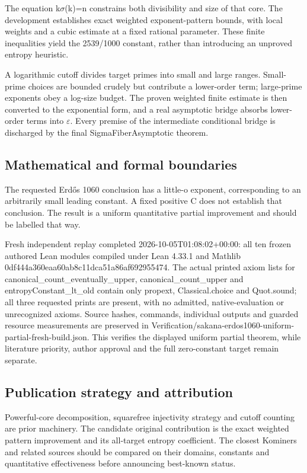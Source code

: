 \documentclass[11pt,a4paper]{article}
\begin{document}
The equation k\ensuremath{\sigma}(k)=n constrains both divisibility and size of that core. The development establishes exact weighted exponent-pattern bounds, with local weights and a cubic estimate at a fixed rational parameter. These finite inequalities yield the 2539/1000 constant, rather than introducing an unproved entropy heuristic.

A logarithmic cutoff divides target primes into small and large ranges. Small-prime choices are bounded crudely but contribute a lower-order term; large-prime exponents obey a log-size budget. The proven weighted finite estimate is then converted to the exponential form, and a real asymptotic bridge absorbs lower-order terms into \ensuremath{\varepsilon}. Every premise of the intermediate conditional bridge is discharged by the final SigmaFiberAsymptotic theorem.

\subsection{Mathematical and formal boundaries}
The requested Erdős 1060 conclusion has a little-o exponent, corresponding to an arbitrarily small leading constant. A fixed positive C does not establish that conclusion. The result is a uniform quantitative partial improvement and should be labelled that way.

Fresh independent replay completed 2026-10-05T01:08:02+00:00: all ten frozen authored Lean modules compiled under Lean 4.33.1 and Mathlib 0df444a360eaa60ab8c11dca51a86af692955474. The actual printed axiom lists for canonical\_count\_eventually\_upper, canonical\_count\_upper and entropyConstant\_lt\_old contain only propext, Classical.choice and Quot.sound; all three requested prints are present, with no admitted, native-evaluation or unrecognized axioms. Source hashes, commands, individual outputs and guarded resource measurements are preserved in Verification/sakana-erdos1060-uniform-partial-fresh-build.json. This verifies the displayed uniform partial theorem, while literature priority, author approval and the full zero-constant target remain separate.

\subsection{Publication strategy and attribution}
Powerful-core decomposition, squarefree injectivity strategy and cutoff counting are prior machinery. The candidate original contribution is the exact weighted pattern improvement and its all-target entropy coefficient. The closest Kominers and related sources should be compared on their domains, constants and quantitative effectiveness before announcing best-known status.
\end{document}
